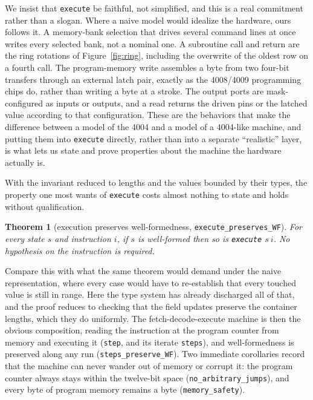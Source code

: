 \documentclass[11pt]{amsart}
\theoremstyle{plain}
\newtheorem{theorem}{Theorem}[section]
\theoremstyle{definition}
\newcommand{\code}[1]{\texttt{#1}}
\begin{document}
We insist that \code{execute} be faithful, not simplified, and this is a real commitment rather than a slogan. Where a naive model would idealize the hardware, ours follows it. A memory-bank selection that drives several command lines at once writes every selected bank, not a nominal one. A subroutine call and return are the ring rotations of Figure~\ref{fig:ring}, including the overwrite of the oldest row on a fourth call. The program-memory write assembles a byte from two four-bit transfers through an external latch pair, exactly as the 4008/4009 programming chips do, rather than writing a byte at a stroke. The output ports are mask-configured as inputs or outputs, and a read returns the driven pins or the latched value according to that configuration. These are the behaviors that make the difference between a model of the 4004 and a model of a 4004-like machine, and putting them into \code{execute} directly, rather than into a separate ``realistic'' layer, is what lets us state and prove properties about the machine the hardware actually is.

With the invariant reduced to lengths and the values bounded by their types, the property one most wants of \code{execute} costs almost nothing to state and holds without qualification.

\begin{theorem}[execution preserves well-formedness, \code{execute\_preserves\_WF}]\label{thm:preserve}
For every state $s$ and instruction $i$, if $s$ is well-formed then so is \code{execute} $s\ i$. No hypothesis on the instruction is required.
\end{theorem}

Compare this with what the same theorem would demand under the naive representation, where every case would have to re-establish that every touched value is still in range. Here the type system has already discharged all of that, and the proof reduces to checking that the field updates preserve the container lengths, which they do uniformly. The fetch-decode-execute machine is then the obvious composition, reading the instruction at the program counter from memory and executing it (\code{step}, and its iterate \code{steps}), and well-formedness is preserved along any run (\code{steps\_preserve\_WF}). Two immediate corollaries record that the machine can never wander out of memory or corrupt it: the program counter always stays within the twelve-bit space (\code{no\_arbitrary\_jumps}), and every byte of program memory remains a byte (\code{memory\_safety}).
\end{document}
